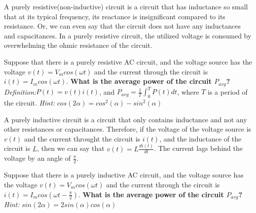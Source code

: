


A purely resistive(non-inductive) circuit is a circuit that has inductance so small that at its typical frequency, its reactance is insignificant
compared to its resistance. Or, we can even say that the circuit does not have any inductances and capacitances. In a purely resistive circuit, the utilized voltage is consumed by overwhelming the ohmic resistance of the circuit.

\begin{enumerate}

\qitem Suppose that there is a purely resistive AC circuit, and the voltage source has the voltage $v(t)=V_mcos(\omega t)$ and the current through
the circuit is $i(t)=I_mcos(\omega t)$. \textbf{What is the average power of the circuit $P_{avg}$?} \textit{Definition:}$P(t)=v(t)i(t)$, and $P_{avg}=\frac{1}{T}\int_{0}^{T}P(t)dt$,
where $T$ is a period of the circuit. \textit{Hint:} $cos(2\alpha)=cos^2(\alpha)-sin^2(\alpha)$

\ws{\vspace{80px}}

\end{enumerate}

A purely inductive circuit is a circuit that only contains inductance and not any other resistances or capacitances. Therefore, if the voltage of the voltage source
is $v(t)$ and the current throught the circuit is $i(t)$, and the inductance of the circuit is $L$, then we can say that $v(t)=L\frac{di(t)}{dt}$. The current lags behind the voltage 
by an angle of $\frac{\pi}{2}$.

\begin{enumerate}[resume]

\qitem Suppose that there is a purely inductive AC circuit, and the voltage source has the voltage $v(t)=V_mcos(\omega t)$ and the current through
the circuit is $i(t)=I_mcos(\omega t-\frac{\pi}{2})$. \textbf{What is the average power of the circuit $P_{avg}$?} \textit{Hint:} $sin(2\alpha)=2sin(\alpha)cos(\alpha)$

\ws{\vspace{80px}}

\end{enumerate}

